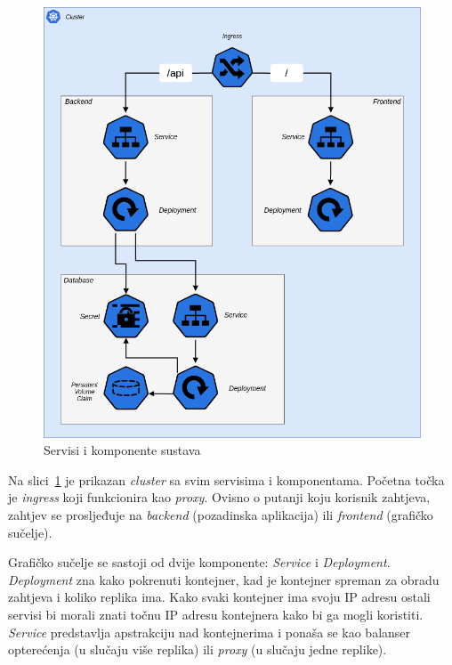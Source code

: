 \pagebreak

\begin{figure}[h!]
    \includegraphics[width=\textwidth]{images/app-infrastructure}
    \caption{Servisi i komponente sustava}
    \label{fig:application-infrastructure}
\end{figure}

Na slici~\ref{fig:application-infrastructure} je prikazan \textit{cluster} sa svim servisima i komponentama.
Početna točka je \textit{ingress} koji funkcionira kao \textit{proxy}.
Ovisno o putanji koju korisnik zahtjeva, zahtjev se prosljeđuje na \textit{backend} (pozadinska aplikacija) ili \textit{frontend} (grafičko sučelje).

Grafičko sučelje se sastoji od dvije komponente: \textit{Service} i \textit{Deployment}.
\textit{Deployment} zna kako pokrenuti kontejner, kad je kontejner spreman za obradu zahtjeva i koliko replika ima.
Kako svaki kontejner ima svoju IP adresu ostali servisi bi morali znati točnu IP adresu kontejnera
kako bi ga mogli koristiti.
\textit{Service} predstavlja apstrakciju nad kontejnerima i ponaša se kao balanser opterećenja (u slučaju više replika)
ili \textit{proxy} (u slučaju jedne replike).

